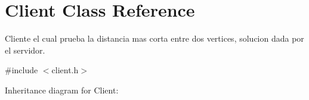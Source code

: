 \hypertarget{classClient}{}\section{Client Class Reference}
\label{classClient}


Cliente el cual prueba la distancia mas corta entre dos vertices, solucion dada por el servidor.  




{\ttfamily \#include $<$client.\+h$>$}



Inheritance diagram for Client\+:
